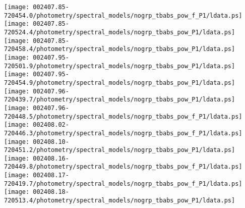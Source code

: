 \documentclass{aastex}
\begin{document}
\begin{figure*}[!ht]
\centering
\texttt{[image: 002407.85-720454.0/photometry/spectral\_models/nogrp\_tbabs\_pow\_f\_P1/ldata.ps]} \hfill 
\texttt{[image: 002407.85-720524.4/photometry/spectral\_models/nogrp\_tbabs\_pow\_P1/ldata.ps]} \hfill 
\texttt{[image: 002407.85-720458.4/photometry/spectral\_models/nogrp\_tbabs\_pow\_P1/ldata.ps]} \\ 
\vspace*{0.5in}
\texttt{[image: 002407.95-720501.9/photometry/spectral\_models/nogrp\_tbabs\_pow\_P1/ldata.ps]} \hfill 
\texttt{[image: 002407.95-720454.9/photometry/spectral\_models/nogrp\_tbabs\_pow\_P1/ldata.ps]} \hfill 
\texttt{[image: 002407.96-720439.7/photometry/spectral\_models/nogrp\_tbabs\_pow\_P1/ldata.ps]} \\ 
\vspace*{0.5in}
\texttt{[image: 002407.96-720448.5/photometry/spectral\_models/nogrp\_tbabs\_pow\_f\_P1/ldata.ps]} \hfill 
\texttt{[image: 002408.02-720446.3/photometry/spectral\_models/nogrp\_tbabs\_pow\_f\_P1/ldata.ps]} \hfill 
\texttt{[image: 002408.10-720451.2/photometry/spectral\_models/nogrp\_tbabs\_pow\_P1/ldata.ps]} \\ 
\vspace*{0.5in}
\texttt{[image: 002408.16-720449.8/photometry/spectral\_models/nogrp\_tbabs\_pow\_f\_P1/ldata.ps]} \hfill 
\texttt{[image: 002408.17-720419.7/photometry/spectral\_models/nogrp\_tbabs\_pow\_f\_P1/ldata.ps]} \hfill 
\texttt{[image: 002408.18-720513.4/photometry/spectral\_models/nogrp\_tbabs\_pow\_P1/ldata.ps]} \\ 
\vspace*{0.5in}
\end{figure*}
\clearpage
\end{document}
